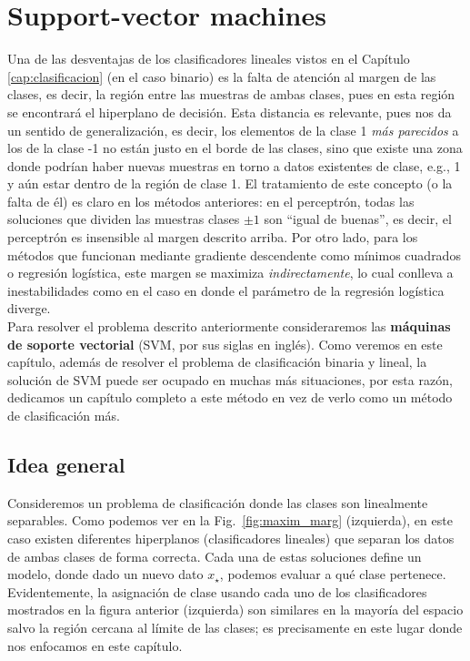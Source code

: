 \section{Support-vector machines}

Una de las desventajas de los clasificadores lineales vistos en el Capítulo \ref{cap:clasificacion} (en el caso binario) es la falta de atención al margen de las clases, es decir, la región entre las muestras de ambas clases, pues en esta región se encontrará el hiperplano de decisión. Esta distancia es relevante, pues nos da un sentido de generalización, es decir,  los elementos de la clase 1  \emph{más parecidos} a los de la clase -1 no están justo en el borde de las clases, sino que existe una zona donde podrían haber nuevas muestras en torno a datos existentes de clase, e.g., 1 y aún estar dentro de la región de clase 1. El tratamiento de este concepto (o la falta de él) es claro en los métodos anteriores: en el perceptrón, todas las soluciones que dividen las muestras clases $\pm 1$ son ``igual de buenas'', es decir, el perceptrón es insensible al margen descrito arriba. Por otro lado, para los métodos que funcionan mediante gradiente descendente como mínimos cuadrados o regresión logística, este margen se maximiza \emph{indirectamente}, lo cual conlleva a inestabilidades como en el caso en donde el parámetro de la regresión logística diverge. \\


Para resolver el problema descrito anteriormente consideraremos las \textbf{máquinas de soporte vectorial} (SVM, por sus siglas en inglés). Como veremos en este capítulo, además de resolver el problema de clasificación binaria y lineal, la solución de SVM puede ser ocupado en muchas más situaciones, por esta razón, dedicamos un capítulo completo a este método en vez de verlo como un método de clasificación más. 

\subsection{Idea general}

Consideremos un problema de clasificación donde las clases son linealmente separables. Como podemos ver en la Fig.~\ref{fig:maxim_marg} (izquierda), en este caso existen diferentes hiperplanos (clasificadores lineales) que separan los datos de ambas clases de forma correcta. Cada una de estas soluciones define un modelo, donde dado un nuevo dato $x_\star$, podemos evaluar a qué clase pertenece. Evidentemente, la asignación de clase usando cada uno de los clasificadores mostrados en la figura  anterior (izquierda) son similares en la mayoría del espacio salvo la región cercana al límite de las clases; es precisamente en este lugar donde nos enfocamos en este capítulo. 


